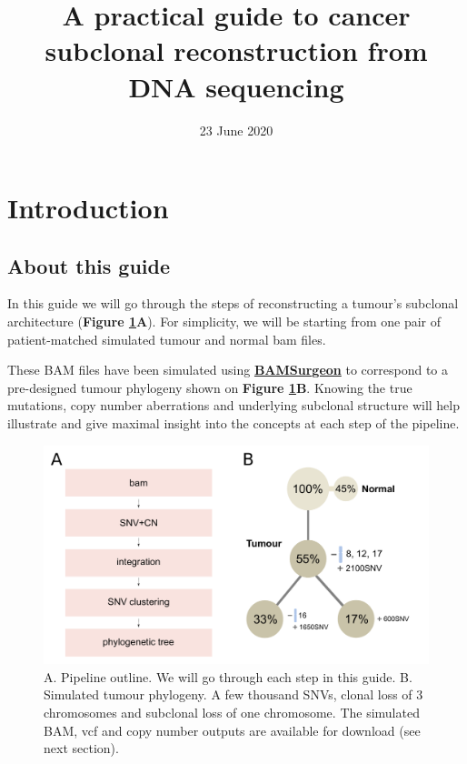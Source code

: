 \documentclass[]{article}
\title{A practical guide to cancer subclonal reconstruction from DNA sequencing}
\author{}
\date{23 June 2020}
\begin{document}
\maketitle

{
\setcounter{tocdepth}{2}
\tableofcontents
}
\newpage

\hypertarget{introduction}{%
\section{Introduction}\label{introduction}}

\hypertarget{about-this-guide}{%
\subsection{About this guide}\label{about-this-guide}}

In this guide we will go through the steps of reconstructing a tumour's
subclonal architecture (\textbf{Figure \ref{Figure1}A}). For simplicity,
we will be starting from one pair of patient-matched simulated tumour
and normal bam files.

These BAM files have been simulated using
\href{https://github.com/adamewing/bamsurgeon}{\textbf{BAMSurgeon}} to
correspond to a pre-designed tumour phylogeny shown on
\textbf{Figure \ref{Figure1}B}. Knowing the true mutations, copy number
aberrations and underlying subclonal structure will help illustrate and
give maximal insight into the concepts at each step of the pipeline.

\begin{figure}[H]
  \centering
  \includegraphics{figures/fig1_pipelineOutline.pdf}
  \caption{A. Pipeline outline. We will go through each step in this
  guide. B. Simulated tumour phylogeny. A few thousand SNVs, clonal
  loss of 3 chromosomes and subclonal loss of one chromosome. 
  The simulated BAM, vcf and copy number outputs are available
  for download (see next section).}
  \label{Figure1}
\end{figure}
\end{document}
